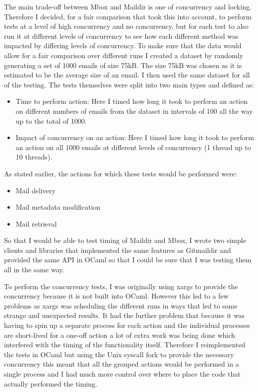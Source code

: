 The main trade-off between Mbox and Maildir is one of concurrency and locking. Therefore I decided, for a fair comparison that took this into account, to perform tests at a level of high concurrency and no concurrency, but for each test to also run it at different levels of concurrency to see how each different method was impacted by differing levels of concurrency. To make sure that the data would allow for a fair comparison over different runs I created a dataset by randomly generating a set of 1000 emails of size 75kB. The size 75kB was chosen as it is estimated to be the average size of an email\cite{email_size}. I then used the same dataset for all of the testing. The tests themselves were split into two main types and defined as:

\begin{itemize}
\item Time to perform action:
  Here I timed how long it took to perform an action on different numbers of emails from the dataset in intervals of 100 all the way up to the total of 1000.
\item Impact of concurrency on an action:
  Here I timed how long it took to perform an action on all 1000 emails at different levels of concurrency (1 thread up to 10 threads).
\end{itemize}

As stated earlier, the actions for which these tests would be performed were:

\begin{itemize}
\item Mail delivery
\item Mail metadata modification
\item Mail retrieval
\end{itemize}

So that I would be able to test timing of Maildir and Mbox, I wrote two simple clients and libraries that implemented the same features as Gitmaildir and provided the same API in OCaml so that I could be sure that I was testing them all in the same way.

To perform the concurrency tests, I was originally using xargs to provide the concurrency because it is not built into OCaml. However this led to a few problems as xargs was scheduling the different runs in ways that led to some strange and unexpected results. It had the further problem that because it was having to spin up a separate process for each action and the individual  processes are short-lived for a one-off action a lot of extra work was being done which interfered with the timing of the functionality itself.
Therefore I reimplemented the tests in OCaml but using the Unix syscall fork to provide the necessary concurrency this meant that all the grouped actions would be performed in a single process and I had much more control over where to place the code that actually performed the timing.

